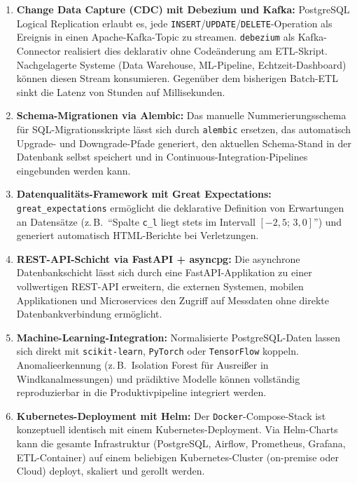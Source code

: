 ﻿\documentclass[12pt,a4paper]{report}
\theoremstyle{definition}
\theoremstyle{remark}
\newcommand{\docker}{\texttt{Docker}}
\newcommand{\code}[1]{\texttt{#1}}
\begin{document}
\begin{enumerate}[leftmargin=1.5em, itemsep=4pt]
  \item \textbf{Change Data Capture (CDC) mit Debezium und Kafka:}
        PostgreSQL Logical Replication erlaubt es, jede
        \code{INSERT}/\code{UPDATE}/\code{DELETE}-Operation als Ereignis
        in einen Apache-Kafka-Topic zu streamen. \code{debezium} als
        Kafka-Connector realisiert dies deklarativ ohne Codeänderung
        am ETL-Skript. Nachgelagerte Systeme (Data Warehouse,
        ML-Pipeline, Echtzeit-Dashboard) können diesen Stream
        konsumieren. Gegenüber dem bisherigen Batch-ETL sinkt die
        Latenz von Stunden auf Millisekunden.

  \item \textbf{Schema-Migrationen via Alembic:}
        Das manuelle Nummerierungsschema für SQL-Migrationsskripte
        lässt sich durch \code{alembic} ersetzen, das automatisch
        Upgrade- und Downgrade-Pfade generiert, den aktuellen
        Schema-Stand in der Datenbank selbst speichert und in
        Continuous-Integration-Pipelines eingebunden werden kann.

  \item \textbf{Datenqualitäts-Framework mit Great Expectations:}
        \code{great\_expectations} ermöglicht die deklarative Definition
        von Erwartungen an Datensätze (z.\,B.\ ``Spalte \code{c\_l}
        liegt stets im Intervall $[-2{,}5;\, 3{,}0]$'') und generiert
        automatisch HTML-Berichte bei Verletzungen.

  \item \textbf{REST-API-Schicht via FastAPI + asyncpg:}
        Die asynchrone Datenbankschicht lässt sich durch eine
        FastAPI-Applikation zu einer vollwertigen REST-API erweitern,
        die externen Systemen, mobilen Applikationen und Microservices
        den Zugriff auf Messdaten ohne direkte Datenbankverbindung
        ermöglicht.

  \item \textbf{Machine-Learning-Integration:}
        Normalisierte PostgreSQL-Daten lassen sich direkt mit
        \code{scikit-learn}, \code{PyTorch} oder \code{TensorFlow}
        koppeln. Anomalieerkennung (z.\,B.\ Isolation Forest für
        Ausreißer in Windkanalmessungen) und prädiktive Modelle
        können vollständig reproduzierbar in die Produktivpipeline
        integriert werden.

  \item \textbf{Kubernetes-Deployment mit Helm:}
        Der \docker-Compose-Stack ist konzeptuell identisch mit einem
        Kubernetes-Deployment. Via Helm-Charts kann die gesamte
        Infrastruktur (PostgreSQL, Airflow, Prometheus, Grafana,
        ETL-Container) auf einem beliebigen Kubernetes-Cluster
        (on-premise oder Cloud) deployt, skaliert und gerollt werden.
\end{enumerate}
\end{document}
